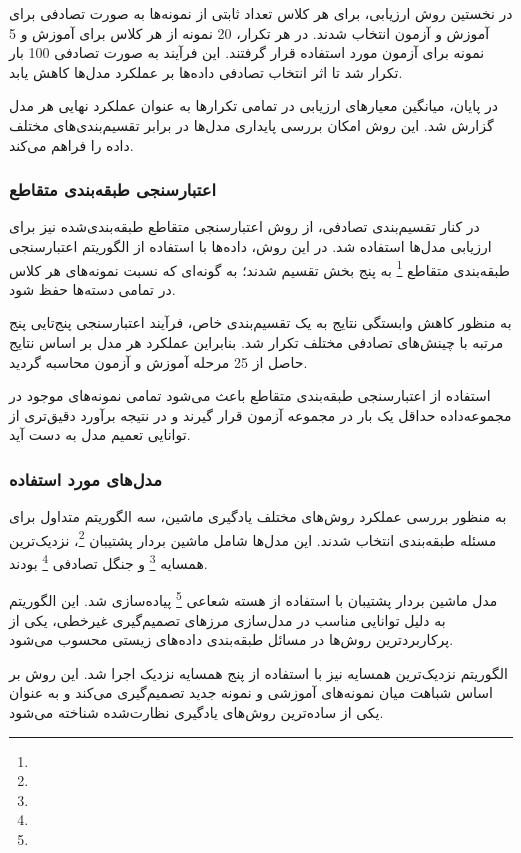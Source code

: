 در نخستین روش ارزیابی، برای هر کلاس تعداد ثابتی از نمونه‌ها به صورت تصادفی برای آموزش و آزمون انتخاب شدند. در هر تکرار، 20 نمونه از هر کلاس برای آموزش و 5 نمونه برای آزمون مورد استفاده قرار گرفتند. این فرآیند به صورت تصادفی 100 بار تکرار شد تا اثر انتخاب تصادفی داده‌ها بر عملکرد مدل‌ها کاهش یابد.

در پایان، میانگین معیارهای ارزیابی در تمامی تکرارها به عنوان عملکرد نهایی هر مدل گزارش شد. این روش امکان بررسی پایداری مدل‌ها در برابر تقسیم‌بندی‌های مختلف داده را فراهم می‌کند.


\subsubsection{اعتبارسنجی طبقه‌بندی متقاطع}

در کنار تقسیم‌بندی تصادفی، از روش اعتبارسنجی متقاطع طبقه‌بندی‌شده نیز برای ارزیابی مدل‌ها استفاده شد. در این روش، داده‌ها با استفاده از الگوریتم اعتبارسنجی طبقه‌بندی متقاطع
\footnote{ }
 به پنج بخش تقسیم شدند؛ به گونه‌ای که نسبت نمونه‌های هر کلاس در تمامی دسته‌ها حفظ شود.

به منظور کاهش وابستگی نتایج به یک تقسیم‌بندی خاص، فرآیند اعتبارسنجی پنج‌تایی پنج مرتبه با چینش‌های تصادفی مختلف تکرار شد. بنابراین عملکرد هر مدل بر اساس نتایج حاصل از 25 مرحله آموزش و آزمون محاسبه گردید.

استفاده از اعتبارسنجی طبقه‌بندی متقاطع باعث می‌شود تمامی نمونه‌های موجود در مجموعه‌داده حداقل یک بار در مجموعه آزمون قرار گیرند و در نتیجه برآورد دقیق‌تری از توانایی تعمیم مدل به دست آید.

\subsubsection{مدل‌های مورد استفاده}

به منظور بررسی عملکرد روش‌های مختلف یادگیری ماشین، سه الگوریتم متداول برای مسئله طبقه‌بندی انتخاب شدند. این مدل‌ها شامل ماشین بردار پشتیبان 
 \footnote{}،
 نزدیک‌ترین همسایه 
 \footnote{}
  و جنگل تصادفی
 \footnote{}
    بودند.

مدل ماشین بردار پشتیبان با استفاده از هسته شعاعی
 \footnote{}
  پیاده‌سازی شد. این الگوریتم به دلیل توانایی مناسب در مدل‌سازی مرزهای تصمیم‌گیری غیرخطی، یکی از پرکاربردترین روش‌ها در مسائل طبقه‌بندی داده‌های زیستی محسوب می‌شود.

الگوریتم نزدیک‌ترین همسایه نیز با استفاده از پنج همسایه نزدیک اجرا شد. این روش بر اساس شباهت میان نمونه‌های آموزشی و نمونه جدید تصمیم‌گیری می‌کند و به عنوان یکی از ساده‌ترین روش‌های یادگیری نظارت‌شده شناخته می‌شود.

